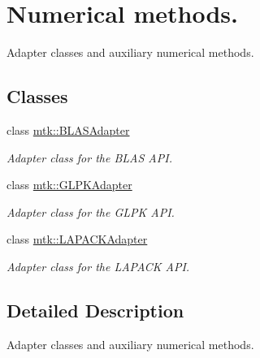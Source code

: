 \hypertarget{group__c05-num__methods}{\section{Numerical methods.}
\label{group__c05-num__methods}
}


Adapter classes and auxiliary numerical methods.  


\subsection*{Classes}
\begin{DoxyCompactItemize}
\item 
class \hyperlink{classmtk_1_1BLASAdapter}{mtk\+::\+B\+L\+A\+S\+Adapter}
\begin{DoxyCompactList}\small\item\em Adapter class for the B\+L\+A\+S A\+P\+I. \end{DoxyCompactList}\item 
class \hyperlink{classmtk_1_1GLPKAdapter}{mtk\+::\+G\+L\+P\+K\+Adapter}
\begin{DoxyCompactList}\small\item\em Adapter class for the G\+L\+P\+K A\+P\+I. \end{DoxyCompactList}\item 
class \hyperlink{classmtk_1_1LAPACKAdapter}{mtk\+::\+L\+A\+P\+A\+C\+K\+Adapter}
\begin{DoxyCompactList}\small\item\em Adapter class for the L\+A\+P\+A\+C\+K A\+P\+I. \end{DoxyCompactList}\end{DoxyCompactItemize}


\subsection{Detailed Description}
Adapter classes and auxiliary numerical methods. 